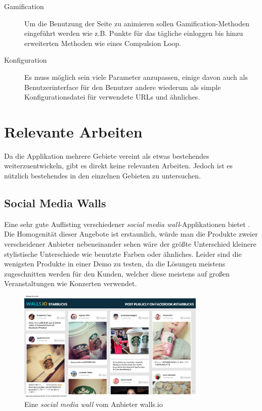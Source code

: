 \documentclass[12pt,twoside]{book}
\begin{document}
\begin{description}
\item[Gamification]
  Um die Benutzung der Seite zu animieren sollen Gamification-Methoden eingeführt werden wie z.B. Punkte für das tägliche einloggen bis hinzu erweiterten Methoden wie eines Compulsion Loop.

\item[Konfiguration]
  Es muss möglich sein viele Parameter anzupassen, einige davon auch als Benutzerinterface für den Benutzer andere wiederum als simple Konfigurationsdatei für verwendete URLs und ähnliches.

\end{description}


\section*{Relevante Arbeiten}

Da die Applikation mehrere Gebiete vereint als etwas bestehendes weiterzuentwickeln, gibt es direkt keine relevanten Arbeiten. Jedoch ist es nützlich bestehendes in den einzelnen Gebieten zu untersuchen.

\subsection*{Social Media Walls}

Eine sehr gute Auflisting verschiedener \textit{social media wall}-Applikationen bietet \citep{hofram}. Die Homogenität dieser Angebote ist erstaunlich, würde man die Produkte zweier verscheidener Anbieter nebeneinander sehen wäre der größte Unterschied kleinere stylistische Unterschiede wie benutzte Farben oder ähnliches. Leider sind die wenigsten Produkte in einer Demo zu testen, da die Lösungen meistens zugeschnitten werden für den Kunden, welcher diese meistens auf großen Veranstaltungen wie Konzerten verwendet. \\

\begin{figure}[H]
    \centering
    \includegraphics[width=0.8\textwidth]{images/Starbucks.png}
    \caption{Eine \textit{social media wall} vom Anbieter walls.io}
    \label{fig:awesome_image}
\end{figure}
\end{document}
